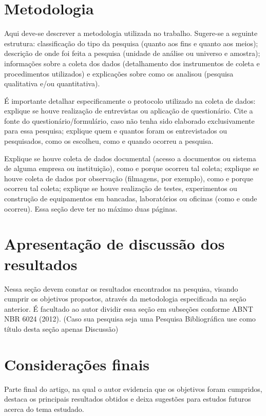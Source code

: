 \documentclass[
article,			%
11pt,				%
twoside,			%
a4paper,			%
section=TITLE,		%
onecolumn,          %
english,			%
brazil,				%
sumario=tradicional
]{abntex2}
\begin{document}
    
\section{Metodologia}
    
Aqui deve-se descrever a metodologia utilizada no trabalho. Sugere-se a seguinte estrutura: classificação do tipo da pesquisa (quanto aos fins e quanto aos meios); descrição de onde foi feita a pesquisa (unidade de análise ou universo e amostra); informações sobre a coleta dos dados (detalhamento dos instrumentos de coleta e procedimentos utilizados) e explicações sobre como os analisou (pesquisa qualitativa e/ou quantitativa).

É importante detalhar especificamente o protocolo utilizado na coleta de dados: explique se houve realização de entrevistas ou aplicação de questionário. Cite a fonte do questionário/formulário, caso não tenha sido elaborado exclusivamente para essa pesquisa; explique quem e quantos foram os entrevistados ou pesquisados, como os escolheu, como e quando ocorreu a pesquisa. 

Explique se houve coleta de dados documental (acesso a documentos ou sistema de alguma empresa ou instituição), como e porque ocorreu tal coleta; explique se houve coleta de dados por observação (filmagens, por exemplo), como e porque ocorreu tal coleta; explique se houve realização de testes, experimentos ou construção de equipamentos em bancadas, laboratórios ou oficinas (como e onde ocorreu). Essa seção deve ter no máximo duas páginas.

\section{Apresentação de discussão dos resultados}
Nessa seção devem constar os resultados encontrados na pesquisa, visando cumprir os objetivos propostos, através da metodologia especificada na seção anterior. É facultado ao autor dividir essa seção em subseções conforme ABNT NBR 6024 (2012). 
(Caso sua pesquisa seja uma Pesquisa Bibliográfica use como título desta seção apenas Discussão)



    
 \section{Considerações finais}
 Parte final do artigo, na qual o autor evidencia que os objetivos foram cumpridos, destaca os principais resultados obtidos e deixa sugestões para estudos futuros acerca do tema estudado.
 
\end{document}
